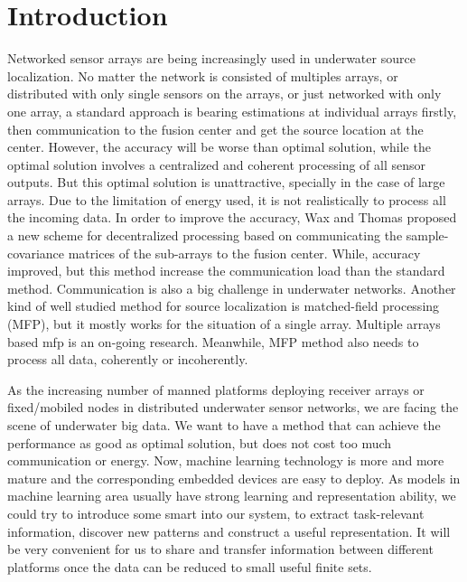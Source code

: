 \section{Introduction}
Networked sensor arrays are being increasingly used in underwater source localization\cite{roan2009distributed}.
No matter the network is consisted of multiples arrays, or distributed
with only single sensors on the arrays, or just networked with only one array\cite{erling2007performance}, a standard approach is bearing estimations at individual arrays firstly, then communication to the fusion center and get the source location at the center\cite{tenney1984distributed,bar1995multitarget,ristic2001influence,kaplan2001bearings}. However, the accuracy will be worse than optimal solution, while the optimal solution involves a centralized and coherent processing of all sensor outputs\cite{schweppe1968sensor}. But this optimal solution is unattractive, specially in the case of large arrays. Due to the limitation of energy used, it is not realistically to process all the incoming data.
In order to improve the accuracy, Wax and Thomas proposed a new scheme for decentralized processing based on communicating the sample-covariance matrices of the sub-arrays to the fusion center\cite{wax1985decentralized}. While, accuracy improved, but this method increase the communication load than the standard method. Communication is also a big challenge in underwater networks. Another kind of well studied method for source localization
is matched-field processing (MFP)\cite{tolstoy1993matched,baggeroer1988matched,baggeroer1993overview}, but it mostly works for the situation of a single array. Multiple arrays based mfp is an on-going research\cite{nichols2015cross,tollefsen2017multiple}. Meanwhile, MFP method also needs to process all data, coherently or incoherently.

As the increasing number of manned platforms deploying receiver arrays or fixed/mobiled nodes in distributed underwater sensor networks, we are facing the scene of underwater big data\cite{Yang2015Issues}.
We want to have a method that can achieve the performance as good as optimal solution, but does not cost too much communication or energy.
Now, machine learning technology is more and more mature and the corresponding embedded devices are easy to deploy. As models in machine learning area usually have strong learning and representation ability, we could try to introduce some smart into our system, to extract task-relevant information, discover new patterns and construct a useful representation.
It will be very convenient for us to share and transfer information between different platforms once the data can be reduced to small useful finite sets.

